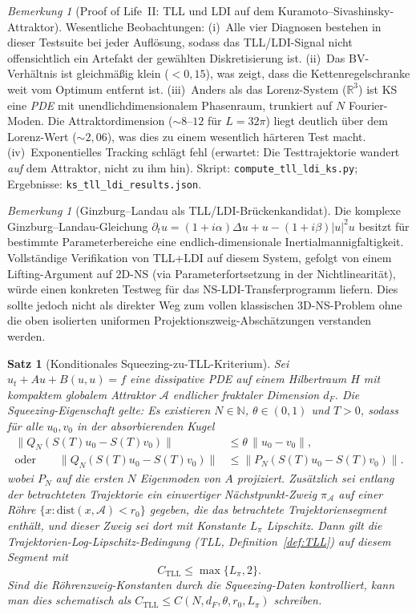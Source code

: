 \documentclass[12pt,a4paper]{article}
\theoremstyle{definition}
\theoremstyle{plain}
\newtheorem{theorem}[definition]{Satz}
\theoremstyle{remark}
\newtheorem{remark}[definition]{Bemerkung}
\newcommand{\dist}{\mathrm{dist}}
\begin{document}
\begin{remark}[Proof of Life~II: TLL und LDI auf dem Kuramoto--Sivashinsky-Attraktor]
Wesentliche Beobachtungen: (i)~Alle vier Diagnosen bestehen in dieser Testsuite bei jeder Auflösung, sodass das
TLL/LDI-Signal nicht offensichtlich ein Artefakt der gewählten Diskretisierung ist.
(ii)~Das BV-Verhältnis ist gleichmäßig klein ($< 0{,}15$), was zeigt, dass die
Kettenregelschranke weit vom Optimum entfernt ist.
(iii)~Anders als das Lorenz-System ($\mathbb{R}^3$) ist KS eine \emph{PDE}
mit unendlichdimensionalem Phasenraum, trunkiert auf $N$ Fourier-Moden.
Die Attraktordimension ($\sim 8$--$12$ für $L = 32\pi$) liegt deutlich über
dem Lorenz-Wert ($\sim 2{,}06$), was dies zu einem wesentlich härteren Test macht.
(iv)~Exponentielles Tracking schlägt fehl (erwartet: Die Testtrajektorie wandert
\emph{auf} dem Attraktor, nicht zu ihm hin).
Skript: \texttt{compute\_tll\_ldi\_ks.py}; Ergebnisse: \texttt{ks\_tll\_ldi\_results.json}.
\end{remark}

\begin{remark}[Ginzburg--Landau als TLL/LDI-Brückenkandidat]
\label{rem:ginzburg-landau}
Die komplexe Ginzburg--Landau-Gleichung $\partial_t u = (1+i\alpha)\Delta u + u - (1+i\beta)|u|^2 u$ besitzt für bestimmte Parameterbereiche eine endlich-dimensionale Inertialmannigfaltigkeit. Vollständige Verifikation von TLL+LDI auf diesem System, gefolgt von einem Lifting-Argument auf 2D-NS (via Parameterfortsetzung in der Nichtlinearität), würde einen konkreten Testweg für das NS-LDI-Transferprogramm liefern. Dies sollte jedoch nicht als direkter Weg zum vollen klassischen 3D-NS-Problem ohne die oben isolierten uniformen Projektionszweig-Abschätzungen verstanden werden.
\end{remark}

\begin{theorem}[Konditionales Squeezing-zu-TLL-Kriterium]\label{thm:squeezing-tll}
Sei $u_t + Au + B(u,u) = f$ eine dissipative PDE auf einem Hilbertraum $H$
mit kompaktem globalem Attraktor $\mathcal{A}$ endlicher fraktaler Dimension $d_F$.
Die Squeezing-Eigenschaft gelte: Es existieren $N \in \mathbb{N}$,
$\theta \in (0,1)$ und $T > 0$, sodass für alle $u_0, v_0$ in der
absorbierenden Kugel
\[
\begin{aligned}
  \|Q_N(S(T)u_0 - S(T)v_0)\|
  &\leq \theta\,\|u_0 - v_0\|,\\
  \text{oder}\qquad
  \|Q_N(S(T)u_0 - S(T)v_0)\|
  &\leq \|P_N(S(T)u_0 - S(T)v_0)\|.
\end{aligned}
\]
wobei $P_N$ auf die ersten $N$ Eigenmoden von $A$ projiziert.
Zusätzlich sei entlang der betrachteten Trajektorie ein einwertiger
Nächstpunkt-Zweig $\pi_{\mathcal{A}}$ auf einer Röhre
$\{x:\dist(x,\mathcal{A})<r_0\}$ gegeben, die das betrachtete
Trajektoriensegment enthält, und dieser Zweig sei dort mit Konstante
$L_\pi$ Lipschitz.  Dann gilt die Trajektorien-Log-Lipschitz-Bedingung
(TLL, Definition~\ref{def:TLL}) auf diesem Segment mit
\[
  C_{\mathrm{TLL}} \leq \max\{L_\pi,2\}.
\]
Sind die Röhrenzweig-Konstanten durch die Squeezing-Daten kontrolliert,
kann man dies schematisch als
$C_{\mathrm{TLL}}\le C(N,d_F,\theta,r_0,L_\pi)$ schreiben.
\end{theorem}
\end{document}
